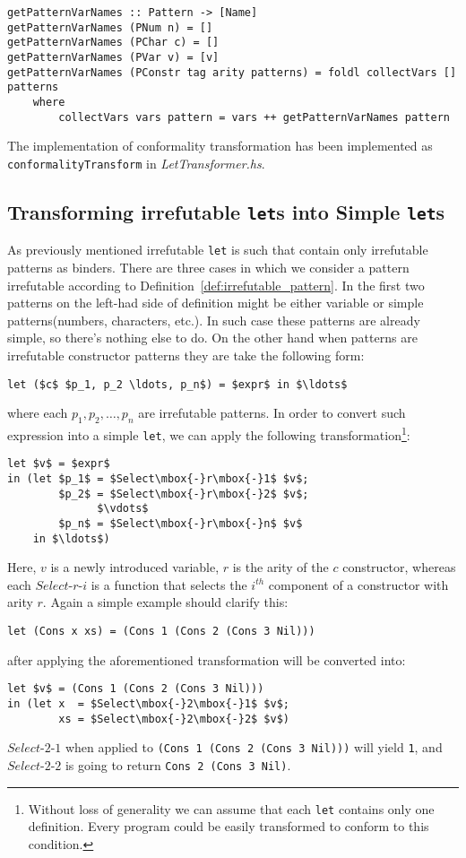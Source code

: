 \documentclass[a4paper]{report}
\begin{document}
\begin{lstlisting}
getPatternVarNames :: Pattern -> [Name]
getPatternVarNames (PNum n) = []
getPatternVarNames (PChar c) = []
getPatternVarNames (PVar v) = [v]
getPatternVarNames (PConstr tag arity patterns) = foldl collectVars [] patterns
    where
        collectVars vars pattern = vars ++ getPatternVarNames pattern
\end{lstlisting}

The implementation of conformality transformation has been implemented as
\texttt{conformalityTransform} in \textit{LetTransformer.hs}.

\subsection{Transforming irrefutable \texttt{let}s into Simple \texttt{let}s}
As previously mentioned irrefutable \texttt{let} is such that contain only
irrefutable patterns as binders. There are three cases in which we consider a
pattern irrefutable according to Definition~\ref{def:irrefutable_pattern}. In
the first two patterns on the left-had side of definition might be either
variable or simple patterns(numbers, characters, etc.). In such case these
patterns are already simple, so there's nothing else to do. On the other hand
when patterns are irrefutable constructor patterns they are take the following
form:
\begin{lstlisting}[mathescape=true]
  let ($c$ $p_1, p_2 \ldots, p_n$) = $expr$ in $\ldots$
\end{lstlisting}
where each $p_1, p_2, \ldots, p_n$ are irrefutable patterns. In order to
convert such expression into a simple \texttt{let}, we can apply the following
transformation\footnote{Without loss of generality we can assume that each
\texttt{let} contains only one definition. Every program could be easily
transformed to conform to this condition.}:
\begin{lstlisting}[mathescape=true]
let $v$ = $expr$
in (let $p_1$ = $Select\mbox{-}r\mbox{-}1$ $v$;
        $p_2$ = $Select\mbox{-}r\mbox{-}2$ $v$;
              $\vdots$
        $p_n$ = $Select\mbox{-}r\mbox{-}n$ $v$
    in $\ldots$)
\end{lstlisting}
Here, $v$ is a newly introduced variable, $r$ is the arity of the $c$
constructor, whereas each $Select\mbox{-}r\mbox{-}i$ is a function that selects
the $i^{th}$ component of a constructor with arity $r$. Again a simple example
should clarify this:
\begin{lstlisting}[mathescape=true]
let (Cons x xs) = (Cons 1 (Cons 2 (Cons 3 Nil)))
\end{lstlisting}
after applying the aforementioned transformation will be converted into:
\begin{lstlisting}[mathescape=true]
let $v$ = (Cons 1 (Cons 2 (Cons 3 Nil)))
in (let x  = $Select\mbox{-}2\mbox{-}1$ $v$;
        xs = $Select\mbox{-}2\mbox{-}2$ $v$)
\end{lstlisting}
$Select\mbox{-}2\mbox{-}1$ when applied to \texttt{(Cons 1 (Cons 2 (Cons 3
Nil)))} will yield \texttt{1}, and $Select\mbox{-}2\mbox{-}2$ is going to return
\texttt{Cons 2 (Cons 3 Nil)}.
\end{document}
